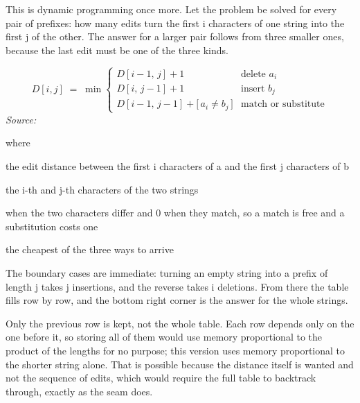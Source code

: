 This is dynamic programming once more. Let the problem be solved for every pair of prefixes: how many edits turn the first i characters of one string into the first j of the other. The answer for a larger pair follows from three smaller ones, because the last edit must be one of the three kinds.


\begin{equation}
D[i,j] \;=\; \min \begin{cases} D[i-1,\,j] + 1 & \text{delete } a_i \\ D[i,\,j-1] + 1 & \text{insert } b_j \\ D[i-1,\,j-1] + \big[\,a_i \neq b_j\,\big] & \text{match or substitute} \end{cases}
\end{equation}
\noindent\emph{Source: }\cite{levenshtein1966}


\noindent where
\begin{description}[leftmargin=2.4em,style=nextline,font=\normalfont\ttfamily]\setlength\itemsep{1pt}
  \item[{$D[i,j]$}] \normalfont the edit distance between the first i characters of a and the first j characters of b
  \item[{$a_i,\, b_j$}] \normalfont the i-th and j-th characters of the two strings
  \item[{$[\,a_i \neq b_j\,]$}]  when the two characters differ and 0 when they match, so a match is free and a substitution costs one
  \item[{$\min$}] \normalfont the cheapest of the three ways to arrive
\end{description}
The boundary cases are immediate: turning an empty string into a prefix of length j takes j insertions, and the reverse takes i deletions. From there the table fills row by row, and the bottom right corner is the answer for the whole strings.


Only the previous row is kept, not the whole table. Each row depends only on the one before it, so storing all of them would use memory proportional to the product of the lengths for no purpose; this version uses memory proportional to the shorter string alone. That is possible because the distance itself is wanted and not the sequence of edits, which would require the full table to backtrack through, exactly as the seam does.


